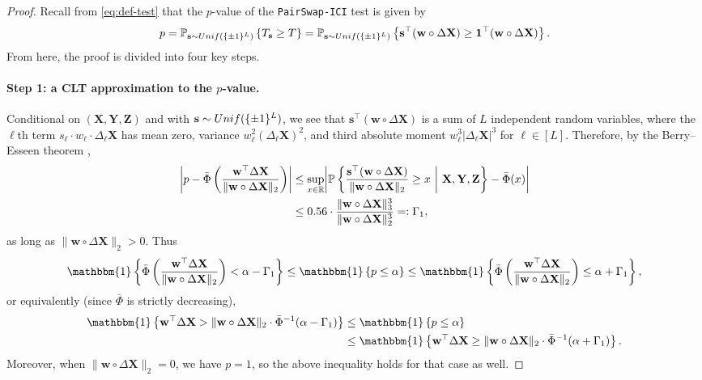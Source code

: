\documentclass[12pt]{article}
\newcommand{\PPst}[2]{\mathbb{P}\left\{{#1}\  \middle| \ {#2}\right\}}
\newcommand{\Pp}[2]{\mathbb{P}_{{#1}}\left\{{#2}\right\}}
\newcommand{\One}[1]{{\mathbbm{1}}\left\{{#1}\right\}}
\newcommand{\bs}{\mathbf{s}}
\newcommand{\bX}{\mathbf{X}}
\newcommand{\bY}{\mathbf{Y}}
\newcommand{\bZ}{\mathbf{Z}}
\newcommand{\bw}{\mathbf{w}}
\newcommand{\RR}{\mathbb{R}}
\begin{document}
\begin{proof}
    Recall from \eqref{eq:def-test} that the $p$-value of the \textnormal{\texttt{PairSwap-ICI}} test is given by 
    \[
    p=\Pp{\bs\sim\textnormal{Unif}(\{\pm1 \}^L)}{T_{\bs}\geq T}=\Pp{\bs\sim\textnormal{Unif}(\{\pm1 \}^L)}{\bs^\top(\bw\circ\Delta\bX)\geq \mathbf{1}^\top (\bw\circ\Delta\bX)}.
    \] From here, the proof is divided into four key steps.
    
    \paragraph{Step 1: a CLT approximation to the $p$-value.}
    
    Conditional on $(\bX,\bY,\bZ)$ and with $\bs\sim\textnormal{Unif}(\{\pm1 \}^L)$, we see that
    $\bs^\top(\bw\circ\Delta\bX)$ is a sum of $L$ independent random variables, where the $\ell$th term $s_\ell\cdot w_\ell \cdot \Delta_\ell\bX$ has mean zero, variance $w_\ell^2(\Delta_\ell\bX)^2$, and third absolute moment $w_\ell^3|\Delta_\ell\bX|^3$ for $\ell \in [L]$. Therefore, by the Berry--Esseen theorem \citep[Theorem~1]{shevtsova2010improvement},  
    \begin{align}\label{eqn:test_as_fucntion_ofWcircDeltaX}
        \left|p-\bar\Phi\left(\frac{\bw^\top \Delta\bX}{\|\bw\circ \Delta\bX\|_2}\right)\right| &\leq \sup_{x\in \RR}\biggl|\PPst{\frac{\bs^\top (\bw\circ\Delta\bX)}{\|\bw\circ \Delta\bX\|_2}\geq x }{ \bX,\bY,\bZ } - \bar\Phi(x)\biggr|\notag\\&\leq 0.56 \cdot \frac{\|\bw\circ \Delta\bX\|_3^3}{\|\bw\circ \Delta\bX\|_2^3} =: \Gamma_1,    
        \end{align}
        as long as $\|\bw\circ \Delta\bX\|_2>0$. 
        Thus
        \[
        \One{\bar\Phi\left(\frac{\bw^\top \Delta\bX}{\|\bw\circ \Delta\bX\|_2}\right) < \alpha - \Gamma_1} \leq \One{p\leq \alpha}\leq \One{\bar\Phi\left(\frac{\bw^\top \Delta\bX}{\|\bw\circ \Delta\bX\|_2}\right) \leq \alpha + \Gamma_1},
        \]
        or equivalently (since $\bar\Phi$ is strictly decreasing), 
         \begin{align*}
         \One{\bw^\top \Delta\bX > \|\bw\circ \Delta\bX\|_2\cdot \bar\Phi^{-1}(\alpha - \Gamma_1)} &\leq \One{p\leq \alpha} \\ 
         &\leq \One{\bw^\top \Delta\bX \geq \|\bw\circ \Delta\bX\|_2\cdot \bar\Phi^{-1}(\alpha + \Gamma_1)}.
         \end{align*}
        Moreover, when $\|\bw\circ \Delta\bX\|_2=0$, we have $p=1$, so the above inequality holds for that case as well. 
        

\end{proof}
\end{document}
